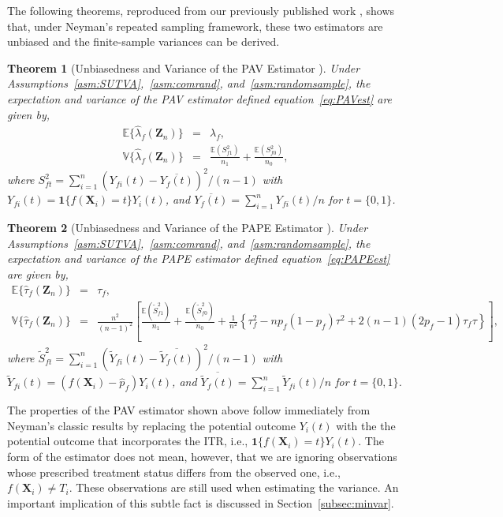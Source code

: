 \documentclass[USenglish,onecolumn]{article}
\renewcommand\r{\right}
\renewcommand\l{\left}
\newcommand\E{\mathbb{E}}
\newcommand\V{\mathbb{V}}
\newcommand\bX{\bm{X}}
\newcommand\bZ{\bm{Z}}
\newtheorem{theorem}{Theorem}
\begin{document}
The following theorems, reproduced from our previously published work
\cite{imai2021experimental}, shows that, under Neyman's repeated
sampling framework, these two estimators are unbiased and the
finite-sample variances can be derived.
\begin{theorem}[Unbiasedness and Variance of the PAV
	Estimator \citep{imai2021experimental}] \label{thm:PAVest}Under
	Assumptions~\ref{asm:SUTVA},~\ref{asm:comrand}, and~\ref{asm:randomsample},
	the expectation and variance of the PAV estimator defined
	equation~\eqref{eq:PAVest} are given by,
	\begin{eqnarray*}
		\E\{\hat\lambda_f(\bZ_n)\} & = & \lambda_f, \\
		\V\{\hat\lambda_f(\bZ_n)\} & = &  \frac{\E(S_{f1}^2)}{n_1} +
		\frac{\E(S_{f0}^2)}{n_0},
	\end{eqnarray*}
	where
	$S_{ft}^2 = \sum_{i=1}^n (Y_{fi}(t) -
	\overline{Y_f(t)})^2/(n-1)$ with
	$Y_{fi}(t) = \mathbf{1}\{f(\bX_i)=t\}Y_i(t)$, and
	$\overline{Y_f(t)} = \sum_{i=1}^n
	Y_{fi}(t)/n$ for $t=\{0,1\}$.
\end{theorem}
\begin{theorem}[Unbiasedness and Variance of the PAPE Estimator
  \citep{imai2021experimental}] \label{thm:PAPEest}Under
  Assumptions~\ref{asm:SUTVA},~\ref{asm:comrand},
  and~\ref{asm:randomsample}, the expectation and variance of the PAPE
  estimator defined equation~\eqref{eq:PAPEest} are given by,
  \begin{eqnarray*}
    \E\{\hat\tau_f(\bZ_n)\} & = & \tau_f, \\
    \V\{\hat\tau_f(\bZ_n)\} & = &  \frac{n^2}{(n-1)^2}\l[\frac{\E(\widetilde{S}_{f1}^2)}{n_1} +
                                \frac{\E(\widetilde{S}_{f0}^2)}{n_0} + \frac{1}{n^2} \l\{\tau_f^2 -n p_f(1-p_f)
                                \tau^2 + 2(n-1)(2p_f-1) \tau_f\tau \r\} \r],
  \end{eqnarray*}
  where
  $\widetilde{S}_{ft}^2 = \sum_{i=1}^n (\widetilde{Y}_{fi}(t) -
  \overline{\widetilde{Y}_f(t)})^2/(n-1)$ with
  $\widetilde{Y}_{fi}(t) = (f(\bX_i) - \hat{p}_f)Y_i(t)$, and
  $\overline{\widetilde{Y}_f(t)} = \sum_{i=1}^n
  \widetilde{Y}_{fi}(t)/n$ for $t=\{0,1\}$.
\end{theorem}

The properties of the PAV estimator shown above follow immediately
from Neyman's classic results by replacing the potential outcome
$Y_i(t)$ with the the potential outcome that incorporates the ITR,
i.e., $\mathbf{1}\{f(\bX_i)=t\}Y_i(t)$.  The form of the estimator
does not mean, however, that we are ignoring observations whose
prescribed treatment status differs from the observed one, i.e.,
$f(\bX_i) \ne T_i$.  These observations are still used when estimating
the variance.  An important implication of this subtle fact is
discussed in Section~\ref{subsec:minvar}.
\end{document}

